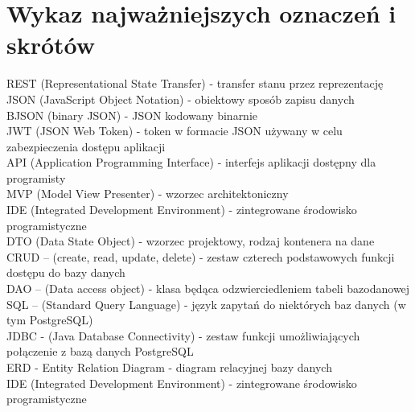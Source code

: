 \documentclass[10pt,twoside,a4paper]{report}
\begin{document}
\chapter*{Wykaz najważniejszych oznaczeń i skrótów}
\noindent REST (Representational State Transfer) - transfer stanu przez reprezentację \\
JSON (JavaScript Object Notation) - obiektowy sposób zapisu danych \\
BJSON (binary JSON) - JSON kodowany binarnie \\
JWT (JSON Web Token) - token w formacie JSON używany w celu zabezpieczenia dostępu aplikacji \\
API (Application Programming Interface) - interfejs aplikacji dostępny dla programisty \\
MVP (Model View Presenter) - wzorzec architektoniczny\\
IDE (Integrated Development Environment) - zintegrowane środowisko programistyczne\\
DTO (Data State Object) - wzorzec projektowy, rodzaj kontenera na dane\\
CRUD – (create, read, update, delete) - zestaw czterech podstawowych funkcji dostępu do bazy danych \\
DAO – (Data access object) - klasa będąca odzwierciedleniem tabeli bazodanowej \\
SQL – (Standard Query Language) - język zapytań do niektórych baz danych (w tym PostgreSQL) \\
JDBC - (Java Database Connectivity) - zestaw funkcji umożliwiających połączenie z bazą danych PostgreSQL \\
ERD - Entity Relation Diagram - diagram relacyjnej bazy danych \\
IDE (Integrated Development Environment) - zintegrowane środowisko programistyczne \\
\end{document}
